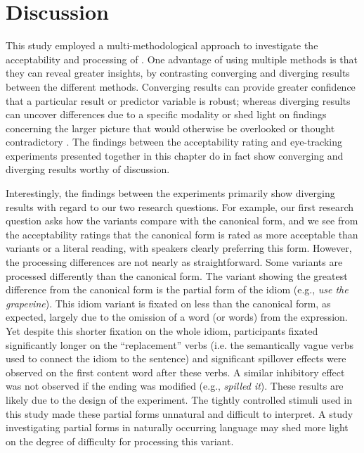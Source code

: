 \documentclass[output=paper
,modfonts
,nonflat]{langsci/langscibook}
\begin{document}




\section{Discussion} 

This study employed a multi-methodological  approach to investigate the acceptability and processing of . One advantage of using multiple methods is that they can reveal greater insights, by contrasting converging and diverging results between the different methods. Converging results can provide greater confidence that a particular result or predictor variable is robust; whereas diverging results can uncover differences due to a specific modality or shed light on findings concerning the larger picture that would otherwise be overlooked or thought contradictory \citep{ArppeJarvikivi2007}. The findings between the acceptability rating and eye-tracking experiments presented together in this chapter do in fact show converging and diverging results  worthy of discussion.

Interestingly, the findings between the experiments primarily show diverging results with regard to our two research questions. For example, our first research question asks how the variants compare with the canonical form, and we see from the acceptability ratings that the canonical form is rated as more acceptable than variants or a literal reading, with speakers clearly preferring this form. However, the processing differences are not nearly as straightforward. Some variants are processed differently than the canonical form. The variant showing the greatest difference from the canonical form is the partial form of the idiom (e.g., \textit{use the grapevine}). This idiom variant is fixated on less than the canonical form, as expected, largely due to the omission of a word (or words) from the expression. Yet despite this shorter fixation on the whole idiom, participants fixated significantly longer on the ``replacement'' verbs (i.e. the semantically vague verbs used to connect the idiom to the sentence) and significant spillover effects were observed on the first content word after these verbs. A similar inhibitory effect was not observed if the ending was modified (e.g., \textit{spilled it}). These results are likely due to the design of the experiment. The tightly controlled stimuli used in this study made these partial forms unnatural and difficult to interpret. A study investigating partial forms in naturally occurring language may shed more light on the degree of difficulty for processing this variant.
\end{document}
